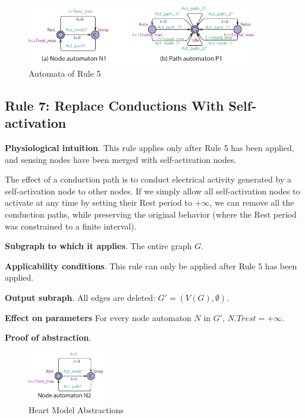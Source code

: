\begin{figure}[!h]
	\centering
	\includegraphics[width=0.9\textwidth]{figs/rule5.pdf}
	\caption{\small Automata of Rule 5}
	\label{fig:rule5}
\end{figure}

\subsection{Rule 7: Replace Conductions With Self-activation}
\textbf{Physiological intuition}. 
This rule applies only after Rule 5 has been applied, and sensing nodes have been merged with self-activation nodes.

The effect of a conduction path is to conduct electrical activity generated by a self-activation node to other nodes. 
If we simply allow all self-activation nodes to activate at any time by setting their Rest period to $+\infty$, we can remove all the conduction paths, while preserving the original behavior (where the Rest period was constrained to a finite interval).

\textbf{Subgraph to which it applies}.
The entire graph $G$.

\textbf{Applicability conditions}.
This rule can only be applied after Rule 5 has been applied.

\textbf{Output subraph}.
All edges are deleted: $G' = (V(G), \emptyset)$.

\textbf{Effect on parameters}
For every node automaton $N$ in $G'$, $N.Trest = +\infty$.

\textbf{Proof of abstraction}.

\begin{figure}[!h]
	\centering
	\includegraphics[width=0.3\textwidth]{figs/rule6.pdf}
	\caption{\small Heart Model Abstractions}
	\label{fig:rule6}
\end{figure}

